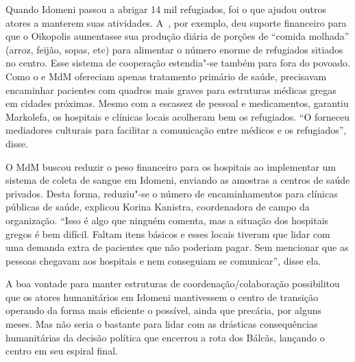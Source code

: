 Quando Idomeni passou a abrigar 14 mil refugiados, foi o  que ajudou
outros atores a manterem suas atividades. A~, por exemplo, deu
suporte financeiro para que o Oikopolis aumentasse sua produção diária
de porções de ``comida molhada'' (arroz, feijão, sopas, etc) para
alimentar o número enorme de refugiados sitiados no centro. Esse
sistema de cooperação estendia"-se também para fora do povoado. Como o
 e MdM ofereciam apenas tratamento primário de saúde, precisavam
encaminhar pacientes com quadros mais graves para estruturas médicas
gregas em cidades próximas. Mesmo com a escassez de pessoal e
medicamentos, garantiu Markolefa, os hospitais e clínicas locais
acolheram bem os refugiados. ``O  forneceu mediadores culturais para
facilitar a comunicação entre médicos e os refugiados'', disse.

O MdM buscou reduzir o peso financeiro para os hospitais ao implementar
um sistema de coleta de sangue em Idomeni, enviando as amostras a
centros de saúde privados. Desta forma, reduziu"-se o número de
encaminhamentos para clínicas públicas de saúde, explicou Korina
Kanistra, coordenadora de campo da organização. ``Isso é algo que
ninguém comenta, mas a situação dos hospitais gregos é bem difícil.
Faltam itens básicos e esses locais tiveram que lidar com uma demanda
extra de pacientes que não poderiam pagar. Sem mencionar que as pessoas
chegavam aos hospitais e nem conseguiam se comunicar'', disse ela.

A boa vontade para manter estruturas de coordenação/colaboração
possibilitou que os atores humanitários em Idomeni mantivessem o centro
de transição operando da forma mais eficiente o possível, ainda que
precária, por alguns meses. Mas não seria o bastante para lidar com as
drásticas consequências humanitárias da decisão política que encerrou a
rota dos Bálcãs, lançando o centro em seu espiral final.


